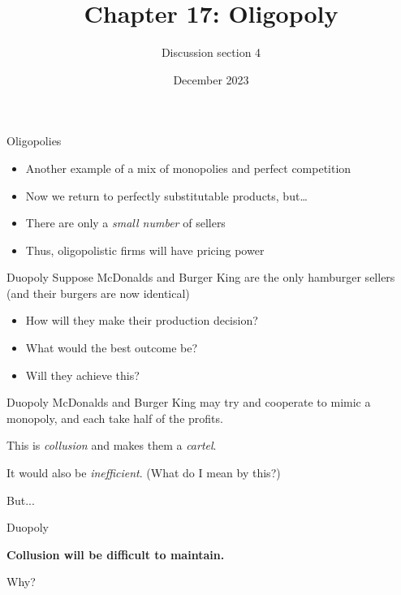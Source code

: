 \documentclass[aspectratio=169]{beamer}
\title{Chapter 17: Oligopoly}
\author{Discussion section 4}
\date{December 2023}
\begin{document}
\begin{frame}
    \titlepage 
\end{frame}

\begin{frame}{Oligopolies}
    \begin{itemize}
        \item Another example of a mix of monopolies and perfect competition
        \item Now we return to perfectly substitutable products, but\dots
        \item There are only a \textit{small number} of sellers
        \item Thus, oligopolistic firms will have pricing power
    \end{itemize}
\end{frame}

\begin{frame}{Duopoly}
    Suppose McDonalds and Burger King are the only hamburger sellers (and their burgers are now identical)
    \begin{itemize}
        \item How will they make their production decision?
        \item What would the best outcome be?
        \item Will they achieve this?
    \end{itemize}
\end{frame}

\begin{frame}{Duopoly}
    McDonalds and Burger King may try and cooperate to mimic a monopoly, and each take half of the profits.

    \vspace{2mm}

    This is \textit{collusion} and makes them a \textit{cartel}.

    \vspace{2mm}

    It would also be \textit{inefficient}. (What do I mean by this?)

    \vspace{2mm}

    But...

\end{frame}


\begin{frame}{Duopoly}
    \begin{center}
        \textbf{Collusion will be difficult to maintain.}

        \vspace{5mm}

        Why?

    \end{center}
\end{frame}
\end{document}
